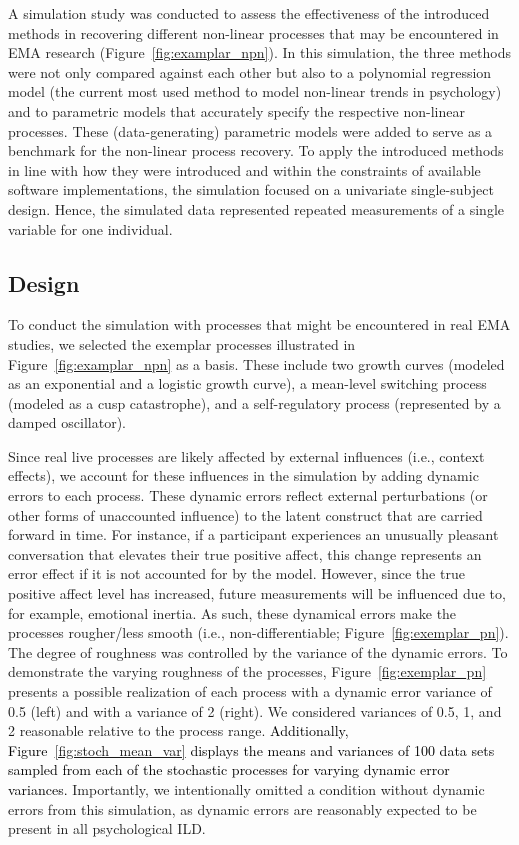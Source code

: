 \documentclass[man, floatsintext]{apa7}
\begin{document}
A simulation study was conducted to assess the effectiveness of the introduced
methods in recovering different non-linear processes that may be encountered in
EMA research (Figure~\ref{fig:examplar_npn}). In this simulation, the three
methods were not only compared against each other but also to a polynomial
regression model (the current most used method to model non-linear trends in
psychology) and to parametric models that accurately specify the respective
non-linear processes. These (data-generating) parametric models were added to
serve as a benchmark for the non-linear process recovery. To apply the
introduced methods in line with how they were introduced and within the
constraints of available software implementations, the simulation focused on a
univariate single-subject design. Hence, the simulated data represented
repeated measurements of a single variable for one individual.

\subsection{Design}

To conduct the simulation with processes that might be encountered in real EMA
studies, we selected the exemplar processes illustrated in
Figure~\ref{fig:examplar_npn} as a basis. These include two growth curves
(modeled as an exponential and a logistic growth curve), a mean-level switching
process (modeled as a cusp catastrophe), and a self-regulatory process
(represented by a damped oscillator).

Since real live processes are likely affected by external influences (i.e.,
context effects), we account for these influences in the simulation by adding
dynamic errors to each process. These dynamic errors reflect external
perturbations (or other forms of unaccounted influence) to the latent construct
that are carried forward in time. For instance, if a participant experiences an
unusually pleasant conversation that elevates their true positive affect, this
change represents an error effect if it is not accounted for by the model.
However, since the true positive affect level has increased, future
measurements will be influenced due to, for example, emotional inertia. As
such, these dynamical errors make the processes rougher/less smooth (i.e.,
non-differentiable; Figure~\ref{fig:exemplar_pn}). The degree of roughness was
controlled by the variance of the dynamic errors. To demonstrate the varying
roughness of the processes, Figure~\ref{fig:exemplar_pn} presents a possible
realization of each process with a dynamic error variance of 0.5 (left) and
with a variance of 2 (right). We considered variances of 0.5, 1, and 2
reasonable relative to the process range. \textcolor{black}{ Additionally,
  Figure~\ref{fig:stoch_mean_var} displays the means and variances of 100 data
  sets sampled from each of the stochastic processes for varying dynamic error
  variances.} Importantly, we intentionally omitted a condition without
dynamic
errors from this simulation, as dynamic errors are reasonably expected to be
present in all psychological ILD\@.
\end{document}
